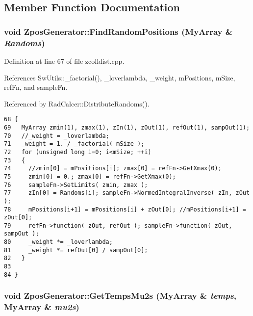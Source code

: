 \subsection{Member Function Documentation}
\subsubsection{\setlength{\rightskip}{0pt plus 5cm}void ZposGenerator::FindRandomPositions (MyArray \& {\em Randoms})}\label{classZposGenerator_167471398a46f21d1013cf97e3606736}




Definition at line 67 of file zcolldist.cpp.

References SwUtils::\_\-factorial(), \_\-loverlambda, \_\-weight, mPositions, mSize, refFn, and sampleFn.

Referenced by RadCalcer::DistributeRandoms().

\begin{Code}\begin{verbatim}68 {
69   MyArray zmin(1), zmax(1), zIn(1), zOut(1), refOut(1), sampOut(1);
70   //_weight = _loverlambda;
71   _weight = 1. / _factorial( mSize );
72   for (unsigned long i=0; i<mSize; ++i)
73   {
74     //zmin[0] = mPositions[i]; zmax[0] = refFn->GetXmax(0);
75     zmin[0] = 0.; zmax[0] = refFn->GetXmax(0);
76     sampleFn->SetLimits( zmin, zmax );
77     zIn[0] = Randoms[i]; sampleFn->NormedIntegralInverse( zIn, zOut ); 
78     mPositions[i+1] = mPositions[i] + zOut[0]; //mPositions[i+1] = zOut[0];
79     refFn->function( zOut, refOut ); sampleFn->function( zOut, sampOut );
80     _weight *= _loverlambda;
81     _weight *= refOut[0] / sampOut[0];
82   }
83 
84 }
\end{verbatim}
\end{Code}


\subsubsection{\setlength{\rightskip}{0pt plus 5cm}void ZposGenerator::GetTempsMu2s (MyArray \& {\em temps}, MyArray \& {\em mu2s})}\label{classZposGenerator_cae2647a7b06e0bb71b69b3616bf8a53}




